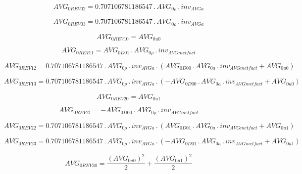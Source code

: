 \documentclass{article}
\begin{document}
\begin{dmath}AVG_{0 REV 02} = 0.707106781186547 \,.\, AVG_{0 \rho} \,.\, inv_{AVG a}\end{dmath}

\begin{dmath}AVG_{0 REV 03} = 0.707106781186547 \,.\, AVG_{0 \rho} \,.\, inv_{AVG a}\end{dmath}

\begin{dmath}AVG_{0 REV 10} = AVG_{0 u0}\end{dmath}

\begin{dmath}AVG_{0 REV 11} = AVG_{0 D01} \,.\, AVG_{0 \rho} \,.\, inv_{AVG met fact}\end{dmath}

\begin{dmath}AVG_{0 REV 12} = 0.707106781186547 \,.\, AVG_{0 \rho} \,.\, inv_{AVG a} \,.\, \left(AVG_{0 D00} \,.\, AVG_{0 a} \,.\, inv_{AVG met fact} + AVG_{0 u0}\right)\end{dmath}

\begin{dmath}AVG_{0 REV 13} = 0.707106781186547 \,.\, AVG_{0 \rho} \,.\, inv_{AVG a} \,.\, \left(- AVG_{0 D00} \,.\, AVG_{0 a} \,.\, inv_{AVG met fact} + AVG_{0 u0}\right)\end{dmath}

\begin{dmath}AVG_{0 REV 20} = AVG_{0 u1}\end{dmath}

\begin{dmath}AVG_{0 REV 21} = - AVG_{0 D00} \,.\, AVG_{0 \rho} \,.\, inv_{AVG met fact}\end{dmath}

\begin{dmath}AVG_{0 REV 22} = 0.707106781186547 \,.\, AVG_{0 \rho} \,.\, inv_{AVG a} \,.\, \left(AVG_{0 D01} \,.\, AVG_{0 a} \,.\, inv_{AVG met fact} + AVG_{0 u1}\right)\end{dmath}

\begin{dmath}AVG_{0 REV 23} = 0.707106781186547 \,.\, AVG_{0 \rho} \,.\, inv_{AVG a} \,.\, \left(- AVG_{0 D01} \,.\, AVG_{0 a} \,.\, inv_{AVG met fact} + AVG_{0 u1}\right)\end{dmath}

\begin{dmath}AVG_{0 REV 30} = \frac{\left(AVG_{0 u0} \right)^{2}}{2} + \frac{\left(AVG_{0 u1} \right)^{2}}{2}\end{dmath}
\end{document}
